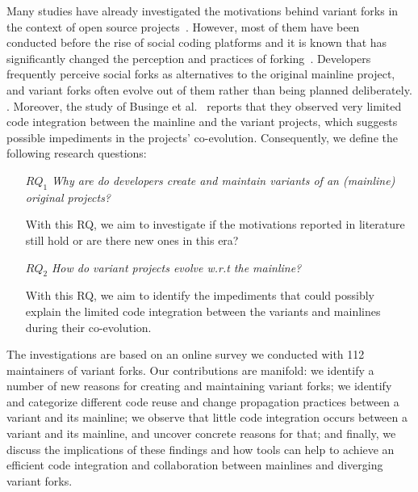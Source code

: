 Many studies have already investigated the motivations behind variant forks in the context of open source projects~\cite{Linus:2012Perspectives,Gregorio:2012,Viseur:2012Forks,Linus:2013CodeForking,Linus:2011ToFork,Gamalielsson:2014Sustainability}.
However, most of them have been conducted before the rise of social coding platforms and it is known that \gh has significantly changed the perception and practices of forking~\cite{Zhou:2020}.
Developers frequently perceive social forks as alternatives to the original mainline project, and variant forks often evolve out of them rather than being planned deliberately. .
Moreover, the study of Businge et al.~\cite{businge:emse:2021} reports that they observed very limited code integration between the mainline and the variant projects, which suggests possible impediments in the projects' co-evolution.  
Consequently, we define the following research questions:
\begin{itemize}
\item [$RQ_1$] \textit{Why are do developers create and maintain variants of an (mainline) original projects?}
\item [] With this RQ, we aim to investigate if the motivations reported in literature still hold or are there new ones in this \gh era?

\item [$RQ_2$] \textit{How do variant projects evolve w.r.t the mainline?}
\item [] With this RQ, we aim to identify the impediments that could possibly explain the limited code integration between the variants and mainlines during their co-evolution.
\end{itemize}


The investigations are based on an online survey we conducted with 112 maintainers of variant forks.
%
Our contributions are manifold:
we identify a number of new reasons for creating and maintaining variant forks;
we identify and categorize different code reuse and change propagation practices between a variant and its mainline;
we observe that little code integration occurs between a variant and its mainline, and uncover concrete reasons for that;
and finally, we discuss the implications of these findings and how tools can help to achieve an efficient code integration and collaboration between mainlines and diverging variant forks.

